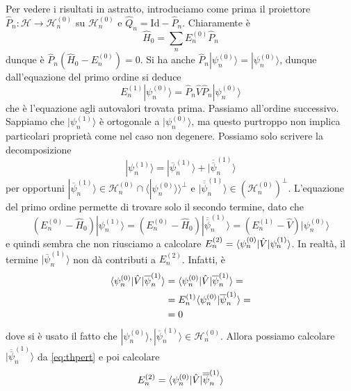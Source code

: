 \documentclass[a4paper, 11pt]{article}
\newcommand{\op}[1]{\hat{#1}}
\renewcommand{\H}{\mathcal{H}}
\newcommand{\id}{\mathrm{Id}}
\renewcommand{\op}[1]{\hat{#1}}
\newcommand{\ham}{\hat{H}}
\renewcommand{\ket}[1]{| #1\rangle}
\begin{document}
 Per vedere i risultati in astratto, introduciamo come prima il proiettore $\op P_n\colon\H\to\H^{(0)}_n$ su $\H^{(0)}_n$ e $\op Q_n=\id-\op P_n$. Chiaramente è
 \[\ham_0=\sum_{n}E_n^{(0)}\op P_n\]
 dunque è $\op P_n(\ham_0-E_n^{(0)})=0$. Si ha anche $\op P_n\ket{\psi_n^{(0)}}=\ket{\psi_n^{(0)}}$, dunque dall'equazione del primo ordine si deduce
 \[E_n^{(1)}\ket{\psi_n^{(0)}}=\op P_n\op V\op P_n\ket{\psi_n^{(0)}}\]
 che è l'equazione agli autovalori trovata prima. Passiamo all'ordine successivo. Sappiamo che $\ket{\psi_n^{(1)}}$ è ortogonale a $\ket{\psi_n^{(0)}}$, ma questo purtroppo non implica particolari proprietà come nel caso non degenere. Possiamo solo scrivere la decomposizione
 \[\ket{\psi_n^{(1)}}=\ket{\overline{\psi}_n^{(1)}}+\ket{\overline{\overline{\psi}}_n^{(1)}}\]
 per opportuni $\ket{\overline{\psi}_n^{(1)}}\in\H_n^{(0)}\cap \langle\ket{\psi_n^{(0)}}\rangle^\perp$ e  $\ket{\overline{\overline{\psi}}_n^{(1)}}\in(\H_n^{(0)})^\perp$. L'equazione del primo ordine permette di trovare solo il secondo termine, dato che
 \begin{equation}\label{eq:thpert}(E_n^{(0)}-\ham_0)\ket{\psi_n^{(1)}}=(E_n^{(0)}-\ham_0)\ket{\overline{\overline{\psi}}_n^{(1)}}=(E_n^{(1)}-\op V)\ket{\psi_n^{(0)}}\end{equation}
 e quindi sembra che non riusciamo a calcolare $E_n^{(2)}=\braketop{\psi_n^{(0)}}{\op V}{\psi_n^{(1)}}$. In realtà, il termine $\ket{\overline{\psi}_n^{(1)}}$ non dà contributi a $E_n^{(2)}$. Infatti, è
 \begin{align*}
 	\braketop{\psi_n^{(0)}}{\op V}{\overline{\psi}_n^{(1)}}&=\braketop{\psi_n^{(0)}}{\op V}{\overline{\psi}_n^{(1)}}=\\&=E_n^{(1)}\braket{\psi_n^{(0)}}{\overline{\psi}_n^{(1)}}=\\&=0
 \end{align*}
 dove si è usato il fatto che $\ket{\psi_n^{(0)}},\ket{\overline{\psi}_n^{(1)}}\in\H_n^{(0)}$. Allora possiamo calcolare $\ket{\overline{\overline{\psi}}_n^{(1)}}$ da \ref{eq:thpert} e poi calcolare
 \[E_n^{(2)}=\braketop{\psi_n^{(0)}}{\op V}{\overline{\overline{\psi}}_n^{(1)}}\]
 
\end{document}
